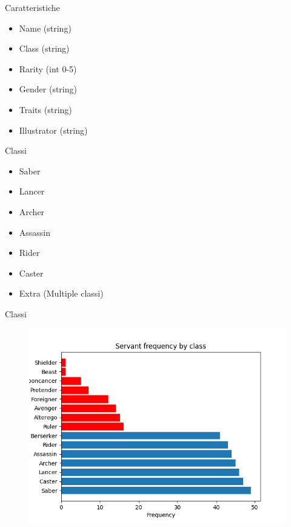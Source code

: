 \documentclass{beamer}
\begin{document}
\begin{darkframes}
  \begin{frame}{Caratteristiche}
    \begin{itemize}
      \item Name (string)
      \item Class (string)
      \item Rarity (int 0-5)
      \item Gender (string)
      \item Traits (string)
      \item Illustrator (string)
    \end{itemize}
  \end{frame}

  \begin{frame}{Classi}
    \begin{itemize}
      \item Saber
      \item Lancer
      \item Archer
      \item Assassin
      \item Rider
      \item Caster
      \item Extra (Multiple classi)
    \end{itemize}
  \end{frame}

  \begin{frame}{Classi}
    \begin{figure}
      \centering
      \includegraphics[scale=0.55]{./images/frequency_by_class.png}
    \end{figure}
  \end{frame}


\end{darkframes}
\end{document}
